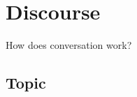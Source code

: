 \chapter{Discourse}
\label{cha:tvk-discourse}

How does conversation work?

\section{Topic}
\label{sec:tvk-discourse-topic}
